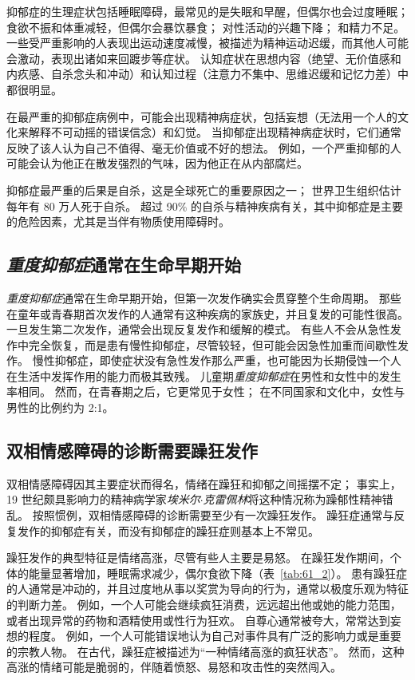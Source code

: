抑郁症的生理症状包括睡眠障碍，最常见的是失眠和早醒，但偶尔也会过度睡眠；
食欲不振和体重减轻，但偶尔会暴饮暴食；
对性活动的兴趣下降；
和精力不足。
一些受严重影响的人表现出运动速度减慢，被描述为精神运动迟缓，而其他人可能会激动，表现出诸如来回踱步等症状。
认知症状在思想内容（绝望、无价值感和内疚感、自杀念头和冲动）和认知过程（注意力不集中、思维迟缓和记忆力差）中都很明显。


在最严重的抑郁症病例中，可能会出现精神病症状，包括妄想（无法用一个人的文化来解释不可动摇的错误信念）和幻觉。
当抑郁症出现精神病症状时，它们通常反映了该人认为自己不值得、毫无价值或不好的想法。
例如，一个严重抑郁的人可能会认为他正在散发强烈的气味，因为他正在从内部腐烂。


抑郁症最严重的后果是自杀，这是全球死亡的重要原因之一；
世界卫生组织估计每年有 80 万人死于自杀。
超过 90\% 的自杀与精神疾病有关，其中抑郁症是主要的危险因素，尤其是当伴有物质使用障碍时。



\subsection{\textit{重度抑郁症}通常在生命早期开始}

\textit{重度抑郁症}通常在生命早期开始，但第一次发作确实会贯穿整个生命周期。
那些在童年或青春期首次发作的人通常有这种疾病的家族史，并且复发的可能性很高。
一旦发生第二次发作，通常会出现反复发作和缓解的模式。
有些人不会从急性发作中完全恢复，而是患有慢性抑郁症，尽管较轻，但可能会因急性加重而间歇性发作。
慢性抑郁症，即使症状没有急性发作那么严重，也可能因为长期侵蚀一个人在生活中发挥作用的能力而极其致残。
儿童期\textit{重度抑郁症}在男性和女性中的发生率相同。
然而，在青春期之后，它更常见于女性；
在不同国家和文化中，女性与男性的比例约为 2:1。



\subsection{双相情感障碍的诊断需要躁狂发作}

双相情感障碍因其主要症状而得名，情绪在躁狂和抑郁之间摇摆不定；
事实上，19 世纪颇具影响力的精神病学家\textit{埃米尔$\cdot$克雷佩林}将这种情况称为躁郁性精神错乱。
按照惯例，双相情感障碍的诊断需要至少有一次躁狂发作。
躁狂症通常与反复发作的抑郁症有关，而没有抑郁症的躁狂症则基本上不常见。


躁狂发作的典型特征是情绪高涨，尽管有些人主要是易怒。
在躁狂发作期间，个体的能量显著增加，睡眠需求减少，偶尔食欲下降（表~\ref{tab:61_2}）。
患有躁狂症的人通常是冲动的，并且过度地从事以奖赏为导向的行为，通常以极度乐观为特征的判断力差。
例如，一个人可能会继续疯狂消费，远远超出他或她的能力范围，或者出现异常的药物和酒精使用或性行为狂欢。
自尊心通常被夸大，常常达到妄想的程度。
例如，一个人可能错误地认为自己对事件具有广泛的影响力或是重要的宗教人物。 在古代，躁狂症被描述为“一种情绪高涨的疯狂状态”。
然而，这种高涨的情绪可能是脆弱的，伴随着愤怒、易怒和攻击性的突然闯入。


